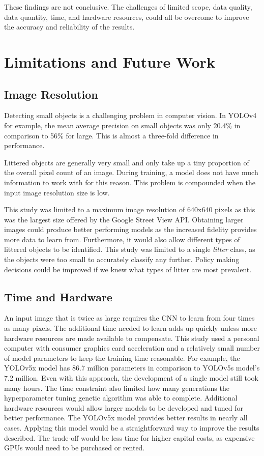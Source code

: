 \documentclass{thesis}
\begin{document}
These findings are not conclusive. The challenges of limited scope, data quality, data quantity, time, and hardware resources, could all be overcome to improve the accuracy and reliability of the results.

\section{Limitations and Future Work}

\subsection{Image Resolution}

Detecting small objects is a challenging problem in computer vision. In YOLOv4 for example, the mean average precision on small objects was only 20.4\% in comparison to 56\% for large\cite{yolov4}. This is almost a three-fold difference in performance.

Littered objects are generally very small and only take up a tiny proportion of the overall pixel count of an image. During training, a model does not have much information to work with for this reason. This problem is compounded when the input image resolution size is low.

This study was limited to a maximum image resolution of 640x640 pixels as this was the largest size offered by the Google Street View API. Obtaining larger images could produce better performing models as the increased fidelity provides more data to learn from. Furthermore, it would also allow different types of littered objects to be identified. This study was limited to a single \textit{litter} class, as the objects were too small to accurately classify any further. Policy making decisions could be improved if we knew what types of litter are most prevalent.

\subsection{Time and Hardware}

An input image that is twice as large requires the CNN to learn from four times as many pixels. The additional time needed to learn adds up quickly unless more hardware resources are made available to compensate. This study used a personal computer with consumer graphics card acceleration and a relatively small number of model parameters to keep the training time reasonable. For example, the YOLOv5x model has 86.7 million parameters in comparison to YOLOv5s model's 7.2 million. Even with this approach, the development of a single model still took many hours. The time constraint also limited how many generations the hyperparameter tuning genetic algorithm was able to complete. Additional hardware resources would allow larger models to be developed and tuned for better performance. The YOLOv5x model provides better results in nearly all cases\cite{better-training-results}. Applying this model would be a straightforward way to improve the results described. The trade-off would be less time for higher capital costs, as expensive GPUs would need to be purchased or rented.
\end{document}
